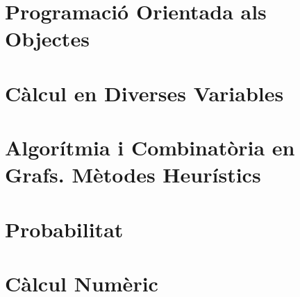 \documentclass[a4paper,12pt]{article}
\author{EDUARDO PÉREZ MOTATO}
\begin{document}
    
    \tableofcontents
    \section{Programació Orientada als Objectes}
    
    \section{Càlcul en Diverses Variables}
    
    \section{Algorítmia i Combinatòria en Grafs. Mètodes Heurístics}
    
    \section{Probabilitat}
    
    \section{Càlcul Numèric}
    
\end{document}
